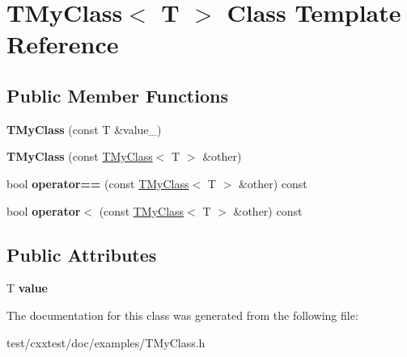 \hypertarget{classTMyClass}{\section{T\-My\-Class$<$ T $>$ Class Template Reference}
\label{classTMyClass}
}
\subsection*{Public Member Functions}
\begin{DoxyCompactItemize}
\item 
\hypertarget{classTMyClass_a878cb3410c6302b17044c7a7601eef93}{{\bfseries T\-My\-Class} (const T \&value\-\_\-)}\label{classTMyClass_a878cb3410c6302b17044c7a7601eef93}

\item 
\hypertarget{classTMyClass_a60cd466974e9fa9535f378080c53c845}{{\bfseries T\-My\-Class} (const \hyperlink{classTMyClass}{T\-My\-Class}$<$ T $>$ \&other)}\label{classTMyClass_a60cd466974e9fa9535f378080c53c845}

\item 
\hypertarget{classTMyClass_a9e5ce2fac8adebd39bb12bea9de265a2}{bool {\bfseries operator==} (const \hyperlink{classTMyClass}{T\-My\-Class}$<$ T $>$ \&other) const }\label{classTMyClass_a9e5ce2fac8adebd39bb12bea9de265a2}

\item 
\hypertarget{classTMyClass_a94c6d9a258b00e44d7846e09a8438ac2}{bool {\bfseries operator$<$} (const \hyperlink{classTMyClass}{T\-My\-Class}$<$ T $>$ \&other) const }\label{classTMyClass_a94c6d9a258b00e44d7846e09a8438ac2}

\end{DoxyCompactItemize}
\subsection*{Public Attributes}
\begin{DoxyCompactItemize}
\item 
\hypertarget{classTMyClass_a8bf4085c462cbdba921ed48847c7b3d8}{T {\bfseries value}}\label{classTMyClass_a8bf4085c462cbdba921ed48847c7b3d8}

\end{DoxyCompactItemize}


The documentation for this class was generated from the following file\-:\begin{DoxyCompactItemize}
\item 
test/cxxtest/doc/examples/T\-My\-Class.\-h\end{DoxyCompactItemize}
